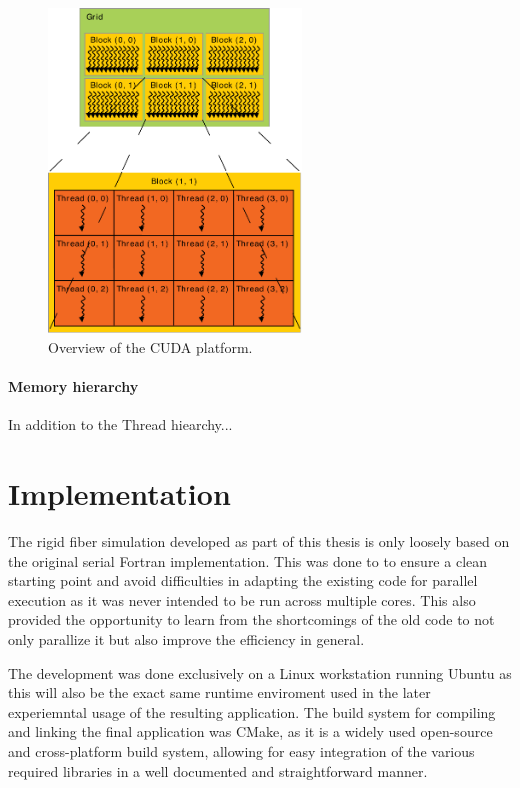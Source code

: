\documentclass[a4paper,11pt]{kth-mag}
\begin{document}
\begin{figure}
  \centering
  \includegraphics[width=0.6\textwidth]{img/grid_blocks.pdf}
  \caption{Overview of the CUDA platform.}
  \label{fig:grid_blocks}
\end{figure}

\paragraph{Memory hierarchy}

In addition to the Thread hiearchy...

\section{Implementation}
The rigid fiber simulation developed as part of this thesis is only loosely based on the original serial Fortran implementation. This was done to to ensure a clean starting point and avoid difficulties in adapting the existing code for parallel execution as it was never intended to be run across multiple cores. This also provided the opportunity to learn from the shortcomings of the old code to not only parallize it but also improve the efficiency in general.

The development was done exclusively on a Linux workstation running Ubuntu as this will also be the exact same runtime enviroment used in the later experiemntal usage of the resulting application. The build system for compiling and linking the final application was CMake, as it is a widely used open-source and cross-platform build system, allowing for easy integration of the various required libraries in a well documented and straightforward manner.
\end{document}
